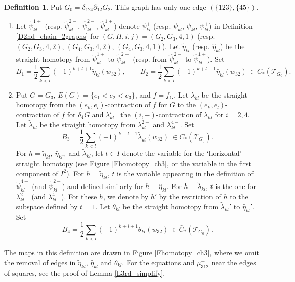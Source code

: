 \documentclass[reqno]{amsart}
\theoremstyle{definition}
\newtheorem{defi}{Definition}[section]
\theoremstyle{plain}
\newcommand{\TT}{\mathcal{T}} %
\begin{document}
\begin{defi}\label{D3rd_chain_2graphs}
Put $G_0=\delta_{124}\partial_{12}G_2$. %
This graph has only one edge $(\{123\},\{45\})$.
\begin{enumerate}
\item  Let $\tilde \psi^{1+}_{kl}$ (resp. $\tilde\psi^{2-}_{kl}$, $\hat\psi^{2-}_{kl}$, $\hat\psi^{1+}_{kl}$) denote $\psi^+_{kl}$ (resp. $\psi^-_{kl}$, $\psi^{-}_{kl}$, $\psi^+_{kl}$) in Definition  \ref{D2nd_chain_2graphs} for $(G,H,i,j)=(G_2,G_3,4,1)$ (resp. $(G_2,G_3,4,2)$, $(G_4,G_3,4,2)$, $(G_4,G_3,4,1)$). Let $\tilde \eta_{kl}$ (resp. $\hat \eta_{kl}$) be the straight homotopy from $\tilde \psi^{1+}_{kl}$ to $\tilde \psi^{2-}_{kl}$ (resp. from $\hat\psi^{2-}_{kl}$ to $\hat\psi^{1+}_{kl}$). Set
\[
B_1 =\frac{1}{2}\sum_{k<l}(-1)^{k+l+1}\tilde \eta_{kl}(w_{32}),\qquad 
B_2 =\frac{1}{2}\sum_{k<l}(-1)^{k+l+1}\hat \eta_{kl}(w_{32})\ \in \bar C_*(\TT_{G_0}).
\]
 

\item Put $G=G_3$, $E(G)=\{e_1<e_2<e_3\}$,  and $f=f_{G}$. Let $\lambda_{kl}$ be the straight homotopy from the $(e_k,e_l)$-contraction of $f$ for $G$ to the $(e_k,e_l)$-contraction of $f$ for $\delta_4G$ and  $\lambda^{i-}_{kl}$ the $(i,-)$-contraction of $\lambda_{kl}$ for $i=2,4$. Let $\tilde \lambda_{kl}$ be the straight homotopy from $\lambda^{2-}_{kl}$ and $\lambda^{4-}_{kl}$. Set 
\[
B_3=\frac{1}{2}\sum_{k<l}(-1)^{k+l+1}\tilde \lambda_{kl}(w_{32})\ \in \bar C_*(\TT_{G_0}).
\]
For $h=\tilde \eta_{kl},\ \hat \eta_{kl},$ and $\tilde \lambda_{kl}$,  let $t\in I$ denote the variable for the `horizontal' straight homotopy (see Figure \ref{Fhomotopy_ch3}, or the variable in the first component of $I^2$). For $h=\tilde \eta_{kl}$, $t$ is the variable appearing in the definition of  $\tilde \psi^{4+}_{kl}$ (and $\tilde \psi^{2-}_{kl}$) and defined similarly for $h=\hat\eta_{kl}$. For $h=\tilde \lambda_{kl}$, $t$ is the one for $\lambda^{2-}_{kl}$ (and $\lambda^{4-}_{kl}$). For these $h$, we denote by $h'$ by the restriction of $h$ to the subspace defined by $t=1$. 
Let $\theta_{kl}$ be the straight homotopy from $\tilde  \lambda_{kl}'$ to $\hat \eta_{kl}'$. Set 
\[
B_4=\frac{1}{2}\sum_{k<l}(-1)^{k+l+1} \theta_{kl}(w_{32})\ \in \bar C_*(\TT_{G_0}).
\]
\end{enumerate}
\end{defi}
The maps in this definition are drawn in Figure \ref{Fhomotopy_ch3}, where we omit the removal of edges in $\tilde \eta_{kl}$, $\hat \eta_{kl}$ and $\theta_{kl}$. For the equations and $\mu_{312}^-$ near the edges of squares, see the proof of Lemma \ref{L3rd_simplify}.
\end{document}
